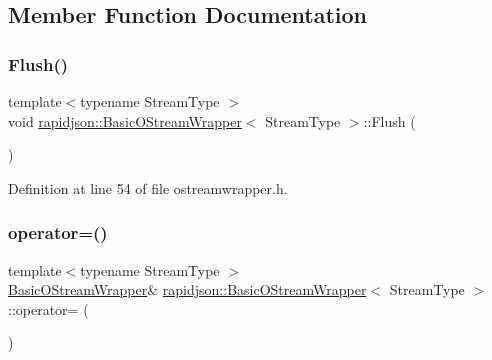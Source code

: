 \subsection{Member Function Documentation}
\mbox{\label{classrapidjson_1_1_basic_o_stream_wrapper_a4d981433f0df0fbcaed206d11642b183}} 
\subsubsection{\texorpdfstring{Flush()}{Flush()}}
{\footnotesize\ttfamily template$<$typename Stream\+Type $>$ \\
void \mbox{\hyperlink{classrapidjson_1_1_basic_o_stream_wrapper}{rapidjson\+::\+Basic\+O\+Stream\+Wrapper}}$<$ Stream\+Type $>$\+::Flush (\begin{DoxyParamCaption}{ }\end{DoxyParamCaption})}



Definition at line 54 of file ostreamwrapper.\+h.


\begin{DoxyCode}{0}

\end{DoxyCode}
\mbox{\label{classrapidjson_1_1_basic_o_stream_wrapper_a7c64e252845130e2d77dc5f934c305a7}} 
\subsubsection{\texorpdfstring{operator=()}{operator=()}}
{\footnotesize\ttfamily template$<$typename Stream\+Type $>$ \\
\mbox{\hyperlink{classrapidjson_1_1_basic_o_stream_wrapper}{Basic\+O\+Stream\+Wrapper}}\& \mbox{\hyperlink{classrapidjson_1_1_basic_o_stream_wrapper}{rapidjson\+::\+Basic\+O\+Stream\+Wrapper}}$<$ Stream\+Type $>$\+::operator= (\begin{DoxyParamCaption}\item[{const \mbox{\hyperlink{classrapidjson_1_1_basic_o_stream_wrapper}{Basic\+O\+Stream\+Wrapper}}$<$ Stream\+Type $>$ \&}]{ }\end{DoxyParamCaption})\hspace{0.3cm}{\ttfamily [private]}}

